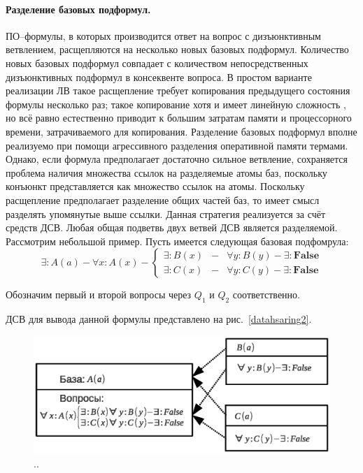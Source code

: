 \paragraph{Разделение базовых подформул.} ПО--формулы, в которых производится ответ на вопрос с дизъюнктивным ветвлением, расщепляются на несколько новых базовых подформул. Количество новых базовых подформул совпадает с количеством непосредственных дизъюнктивных подформул в консеквенте вопроса. В простом варианте реализации ЛВ \cite{dissChe} такое расщепление требует копирования предыдущего состояния формулы несколько раз; такое копирование хотя и имеет линейную сложность \cite{Che2}, но всё равно естественно приводит к большим затратам памяти и процессорного времени, затрачиваемого для копирования. Разделение базовых подформул вполне реализуемо при помощи агрессивного разделения оперативной памяти термами. Однако, если формула предполагает достаточно сильное ветвление, сохраняется проблема наличия множества ссылок на разделяемые атомы баз, поскольку конъюнкт представляется как множество ссылок на атомы. Поскольку расщепление предполагает разделение общих частей баз, то имеет смысл разделять упомянутые выше ссылки. Данная стратегия реализуется за счёт средств ДСВ. Любая общая подветвь двух ветвей ДСВ является разделяемой. Рассмотрим небольшой пример.
 Пусть имеется следующая базовая подфомрула:
$$\exists: A(a) - \forall x: A(x) - \left\{
\begin{array}{lcl}
 \exists \colon B(x) & - & \forall y: B(y) - \exists\colon\boldsymbol{False}\\
 \exists \colon C(x) & - & \forall y: C(y) - \exists\colon\boldsymbol{False}
\end{array}
\right. $$

Обозначим первый и второй вопросы через $Q_1$ и $Q_2$ соответственно.

ДСВ для вывода данной формулы представлено на рис.~\ref{datahsaring2}.

\begin{figure}[h]
	\centering
	\includegraphics[width=0.7\linewidth]{pics/DataSharing2.eps}
	\caption{..}
	\label{fig:datasharing2}
\end{figure}

